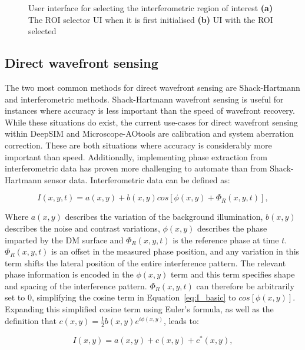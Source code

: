 \begin{figure}[h]
\begin{subfigure}{0.4\textwidth}
		\caption{}
		\label{fig:ROI_selector}
	\end{subfigure}
	\caption[User interface for selecting the interferometric region of interest]{User interface for selecting the interferometric region of interest \textbf{(a)} The ROI selector UI when it is first initialised \textbf{(b)} UI with the ROI selected}
	\label{fig:ROI_selectors}
\end{figure}

\subsection{Direct wavefront sensing}
\label{subsec:direct_wavefront_sensing}

The two most common methods for direct wavefront sensing are Shack-Hartmann and interferometric methods. Shack-Hartmann wavefront sensing is useful for instances where accuracy is less important than the speed of wavefront recovery. While these situations do exist, the current use-cases for direct wavefront sensing within DeepSIM and Microscope-AOtools are calibration and system aberration correction. These are both situations where accuracy is considerably more important than speed. Additionally, implementing phase extraction from interferometric data has proven more challenging  to automate than from Shack-Hartmann sensor data. Interferometric data can be defined as:

\begin{equation}\label{eq:I_basic}
I(x,y,t) = a(x,y) + b(x,y)cos[\phi(x,y) + \Phi_{R}(x,y,t)],
\end{equation}

Where $a(x,y)$ describes the variation of the background illumination, $b(x,y)$ describes the noise and contrast variations, $\phi(x,y)$ describes the phase imparted by the DM surface and $\Phi_{R}(x,y,t)$ is the reference phase at time $t$. $\Phi_{R}(x,y,t)$ is an offset in the measured phase position, and any variation in this term shifts the lateral position of the entire interference pattern. The relevant phase information is encoded in the $\phi(x,y)$ term and this term specifies shape and spacing of the interference pattern. $\Phi_{R}(x,y,t)$ can therefore be arbitrarily set to 0, simplifying the cosine term in Equation~\ref{eq:I_basic} to $cos[\phi(x,y)]$. Expanding this simplified cosine term using Euler's formula, as well as the definition that $c(x,y) = \frac{1}{2}b(x,y)e^{i\phi(x,y)}$, leads to:

\begin{equation}\label{eq:I_cos_expand}
I(x,y) = a(x,y) + c(x,y) + c^{*}(x,y),
\end{equation}

